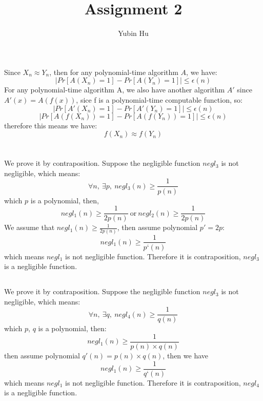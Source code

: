 \documentclass[onecolumn,oneside]{SUSTechHomework}
\author{Yubin Hu}
\title{Assignment 2}
\begin{document}
  \maketitle

  \section{}

  Since $X_n \approx Y_n$, then for any polynomial-time algorithm $A$, we have:
  $$|Pr[A(X_n)=1]-Pr[A(Y_n)=1]| \le \epsilon(n)$$
  For any polynomial-time algorithm A, we also have another algorithm $A'$ since $A'(x) = A(f(x))$, sice f is a polynomial-time computable function, so:
  $$|Pr[A'(X_n)=1]-Pr[A'(Y_n)=1]| \le \epsilon(n)$$
  $$|Pr[A(f(X_n))=1]-Pr[A(f(Y_n))=1]| \le \epsilon(n)$$
  therefore this means we have:
  $$f(X_n) \approx f(Y_n)$$

  \section{}

    \subsection{}

    We prove it by contraposition.
    Suppose the negligible function $negl_3$ is not negligible, which means:
    $$\forall n,~\exists p,~negl_3(n) \ge \frac{1}{p(n)}$$
    which $p$ is a polynomial, then,
    $$negl_1(n) \ge \frac{1}{2p(n)}~\mbox{or}~negl_2(n) \ge \frac{1}{2p(n)}$$
    We assume that $negl_1(n) \ge \frac{1}{2p(n)}$, then assume polynomial $p'=2p$:
    $$negl_1(n) \ge \frac{1}{p‘(n)}$$
    which means $negl_1$ is not negligible function.
    Therefore it is contraposition, $negl_3$ is a negligible function.

    \subsection{}

    We prove it by contraposition.
    Suppose the negligible function $negl_3$ is not negligible, which means:
    $$\forall n,~\exists q,~negl_4(n) \ge \frac{1}{q(n)}$$
    which $p$, $q$ is a polynomial, then:
    $$negl_1(n) \ge \frac{1}{p(n) \times q(n)}$$
    then assume polynomial $q'(n) = p(n) \times q(n)$, then we have
    $$negl_1(n) \ge \frac{1}{q‘(n)}$$
    which means $negl_1$ is not negligible function.
    Therefore it is contraposition, $negl_4$ is a negligible function.
\end{document}
